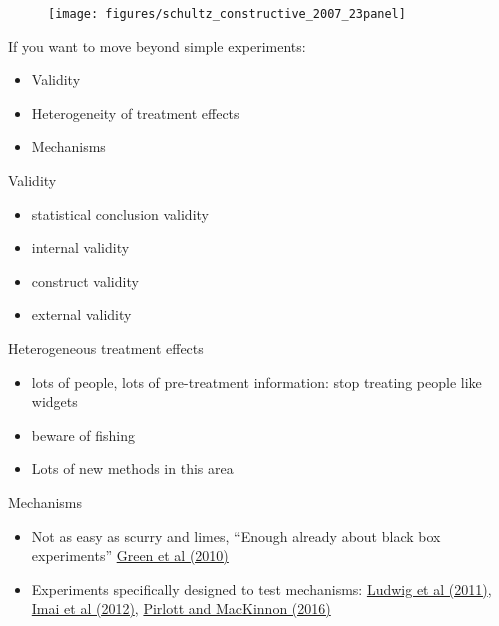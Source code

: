 \documentclass[aspectratio=169]{beamer}
\begin{document}
\begin{frame}

\begin{figure}
  \centering
  \texttt{[image: figures/schultz\_constructive\_2007\_23panel]}
\end{figure}

\end{frame}
\begin{frame}

If you want to move beyond simple experiments:
\begin{itemize}
\item Validity
\item Heterogeneity of treatment effects
\item Mechanisms
\end{itemize}

\end{frame}
\begin{frame}

Validity
\begin{itemize}
\item statistical conclusion validity
\item internal validity
\item construct validity
\item external validity
\end{itemize}

\end{frame}
\begin{frame}

Heterogeneous treatment effects 
\begin{itemize}
\item lots of people, lots of pre-treatment information: stop treating people like widgets
\pause
\item beware of fishing
\pause
\item Lots of new methods in this area
\end{itemize}

\end{frame}
\begin{frame}

Mechanisms
\begin{itemize}
\item Not as easy as scurry and limes, ``Enough already about black box experiments''  \textcolor{blue}{\href{http://dx.doi.org/10.1177/0002716209351526}{Green et al (2010)}}
\pause
\item Experiments specifically designed to test mechanisms: \textcolor{blue}{\href{http://dx.doi.org/10.1257/jep.25.3.17}{Ludwig et al (2011)}}, \textcolor{blue}{\href{http://dx.doi.org/10.1111/j.1467-985X.2012.01032.x}{Imai et al (2012)}}, \textcolor{blue}{\href{http://dx.doi.org/10.1016/j.jesp.2015.09.012}{Pirlott and MacKinnon (2016)}}
\end{itemize}

\end{frame}
\end{document}
